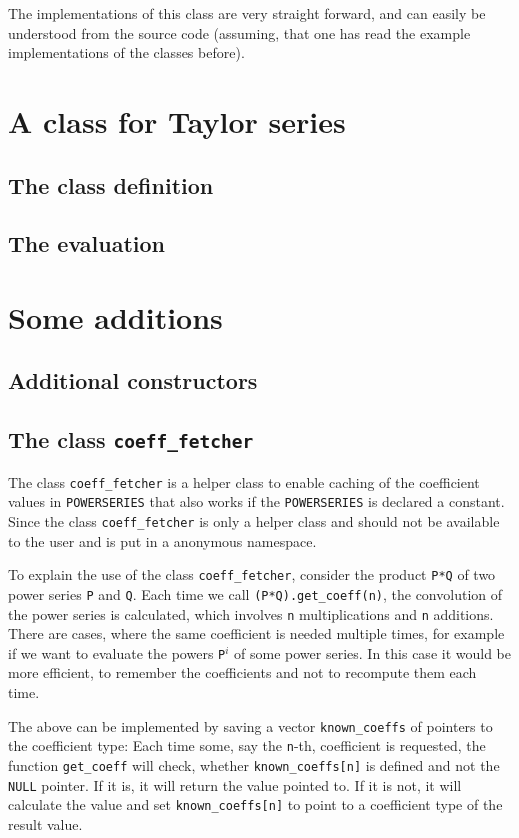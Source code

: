 \documentclass{article}
\newcommand{\code}[1]{\texttt{#1}}
\newcommand{\func}[1]{\texttt{#1}}
\newcommand{\NULL}{\texttt{NULL} pointer\xspace}
\begin{document}
The implementations of this class are very straight forward, and can easily be understood from the source code (assuming, that one has read the example implementations of the classes before).


\section{A class for Taylor series}

\subsection{The class definition}
\subsection{The evaluation}

\section{Some additions}

\subsection{Additional constructors}

\subsection{The class \code{coeff\_fetcher}}

The class \code{coeff\_fetcher} is a helper class to enable caching of the coefficient values in \func{POWERSERIES} that also works if the \func{POWERSERIES} is declared a constant. Since the class \code{coeff\_fetcher} is only a helper class and should not be available to the user and is put in a anonymous namespace.

To explain the use of the class \code{coeff\_fetcher}, consider the product \code{P*Q} of two power series \code{P} and \code{Q}. Each time we call \code{(P*Q).get\_coeff(n)}, the convolution of the power series is calculated, which involves \code{n} multiplications and \code{n} additions. There are cases, where the same coefficient is needed multiple times, for example if we want to evaluate the powers \code{P}$^i$ of some power series. In this case it would be more efficient, to remember the coefficients and not to recompute them each time.

The above can be implemented by saving a vector \code{known\_coeffs} of pointers to the coefficient type: Each time some, say the \code{n}-th, coefficient is requested, the function \code{get\_coeff} will check, whether \code{known\_coeffs[n]} is defined and not the \NULL. If it is, it will return the value pointed to. If it is not, it will calculate the value and set \code{known\_coeffs[n]} to point to a coefficient type of the result value.
\end{document}
